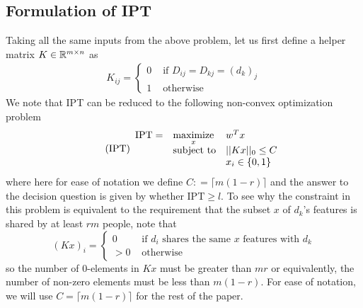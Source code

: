 \documentclass[12pt]{article}
\newcommand{\priv}{\text{IPT}}
\begin{document}
\subsection{Formulation of \gls{IPT}}
Taking all the same inputs from the above problem, let us first define a helper matrix $K \in \mathbb{R}^{m\times n}$ as
\begin{align*}
    K_{ij} = \begin{cases}
        0 & \text{ if } D_{ij} = D_{kj} = (d_k)_j\\
        1 & \text{ otherwise}
    \end{cases}
\end{align*} 
We note that \gls{IPT} can be reduced to the following non-convex optimization problem
\begin{equation}
	\label{eq:priv} 
    \tag{$\priv$} 
	\begin{array}{lll}
		\priv = & \underset{x}{\text{maximize}} & w^T x \\
		& \mbox{subject to} & ||K x||_{0}  \leq C \\
        && x_i \in \{0,1\}
		\end{array}
\end{equation}
where here for ease of notation we define $C: = \lceil m(1-r)\rceil$ and the answer to the decision question is given by whether $\priv \geq l$. To see why the constraint in this problem is equivalent to the requirement that the subset $x$ of $d_k$'s features is shared by at least $rm$ people, note that  \[(Kx)_i = \begin{cases}
    0 & \text{ if } d_i \text{ shares the same } x \text{ features with } d_k \\
    > 0 & \text{ otherwise}
\end{cases}
\]
so the number of 0-elements in $Kx$ must be greater than $mr$ or equivalently, the number of non-zero elements must be less than $m(1-r)$. For ease of notation, we will use $C = \lceil m(1-r)\rceil$ for the rest of the paper.
\end{document}
